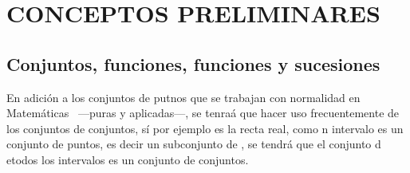 \chapter{CONCEPTOS PRELIMINARES}
\section{Conjuntos, funciones, funciones y sucesiones}
En adición a los conjuntos de putnos que se trabajan con normalidad en
Matemáticas ~---puras y aplicadas---, se tenraá que hacer uso
frecuentemente de los conjuntos de conjuntos, sí por ejemplo es la
recta real, como n intervalo es un conjunto de puntos, es decir un
subconjunto de , se tendrá que el conjunto d etodos los intervalos es
un conjunto de conjuntos.
